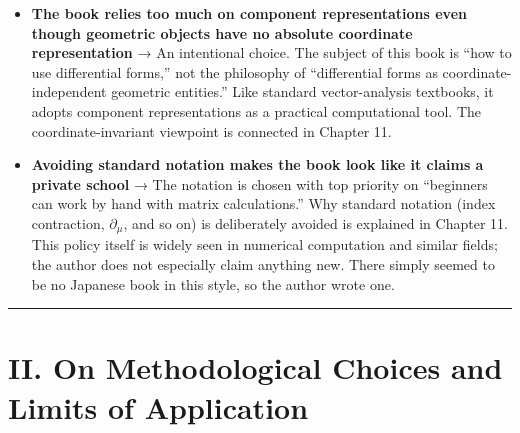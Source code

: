 \begin{itemize}
  subtraction. The more standard abstract viewpoint is signposted in
  Chapter 11.
\item
  \textbf{The book relies too much on component representations even though geometric objects have no absolute coordinate representation}
  → An intentional choice. The subject of this book is ``how to use
  differential forms,'' not the philosophy of ``differential forms as
  coordinate-independent geometric entities.'' Like standard
  vector-analysis textbooks, it adopts component representations as a
  practical computational tool. The coordinate-invariant viewpoint is
  connected in Chapter 11.
\item
  \textbf{Avoiding standard notation makes the book look like it claims a private school}
  → The notation is chosen with top priority on ``beginners can work by
  hand with matrix calculations.'' Why standard notation (index
  contraction, \(\partial_\mu\), and so on) is deliberately avoided is
  explained in Chapter 11. This policy itself is widely seen in
  numerical computation and similar fields; the author does not
  especially claim anything new. There simply seemed to be no Japanese
  book in this style, so the author wrote one.
\end{itemize}

\begin{center}\rule{0.5\linewidth}{0.5pt}\end{center}

\hypertarget{ii.-on-methodological-choices-and-limits-of-application}{%
\section{II. On Methodological Choices and Limits of
Application}\label{ii.-on-methodological-choices-and-limits-of-application}}

